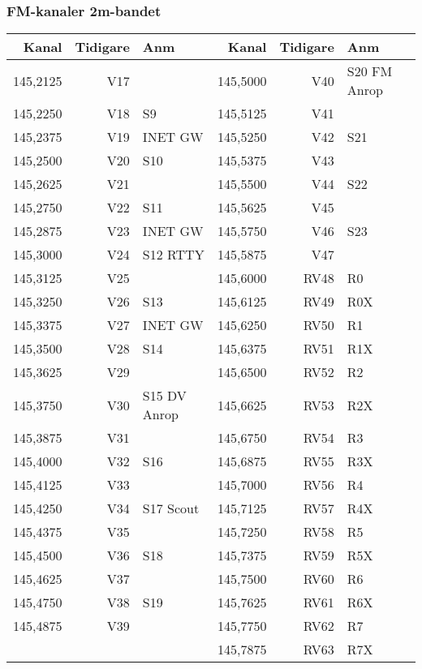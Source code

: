 \clearpage
\subsubsection{FM-kanaler 2m-bandet}

\begin{longtable}{rrl|rrl}
\textbf{Kanal} & \textbf{Tidigare} & \textbf{Anm}   
&  \textbf{Kanal} & \textbf{Tidigare} & \textbf{Anm} \\ \hline
	145,2125 &   V17 &              & 145,5000 &   V40 & S20  FM Anrop \\
	145,2250 &   V18 & S9           & 145,5125 &   V41 &  \\
	145,2375 &   V19 & INET GW      & 145,5250 &   V42 & S21           \\
	145,2500 &   V20 & S10          & 145,5375 &   V43 &  \\
	145,2625 &   V21 &              & 145,5500 &   V44 & S22           \\
	145,2750 &   V22 & S11          & 145,5625 &   V45 &  \\
	145,2875 &   V23 & INET GW      & 145,5750 &   V46 & S23           \\
	145,3000 &   V24 & S12  RTTY    & 145,5875 &   V47 &  \\
	145,3125 &   V25 &              & 145,6000 &  RV48 & R0            \\
	145,3250 &   V26 & S13          & 145,6125 &  RV49 & R0X           \\
	145,3375 &   V27 & INET GW      & 145,6250 &  RV50 & R1            \\
	145,3500 &   V28 & S14          & 145,6375 &  RV51 & R1X           \\
	145,3625 &   V29 &              & 145,6500 &  RV52 & R2            \\
	145,3750 &   V30 & S15 DV Anrop & 145,6625 &  RV53 & R2X           \\
	145,3875 &   V31 &              & 145,6750 &  RV54 & R3            \\
	145,4000 &   V32 & S16          & 145,6875 &  RV55 & R3X           \\
	145,4125 &   V33 &              & 145,7000 &  RV56 & R4            \\
	145,4250 &   V34 & S17 Scout    & 145,7125 &  RV57 & R4X           \\
	145,4375 &   V35 &              & 145,7250 &  RV58 & R5            \\
	145,4500 &   V36 & S18          & 145,7375 &  RV59 & R5X           \\
	145,4625 &   V37 &              & 145,7500 &  RV60 & R6            \\
	145,4750 &   V38 & S19          & 145,7625 &  RV61 & R6X           \\
	145,4875 &   V39 &              & 145,7750 &  RV62 & R7            \\
	         &       &              & 145,7875 &  RV63 & R7X
\end{longtable}

